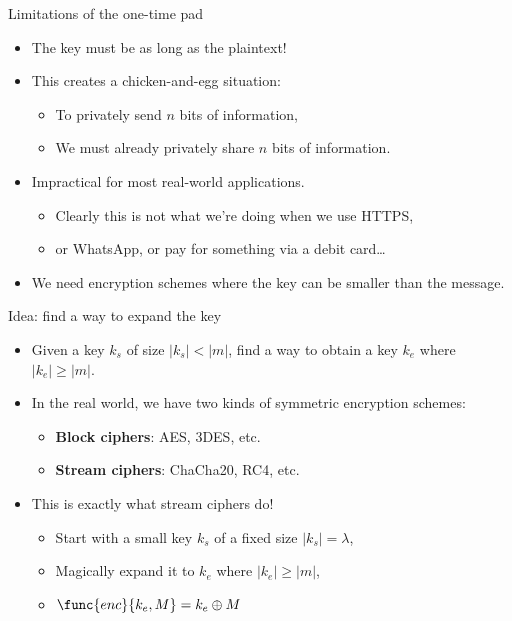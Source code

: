 \ifdefined\PRESENTATION\else\PassOptionsToClass{handout}{beamer}\fi\documentclass[aspectratio=169, lualatex]{beamer}
\begin{document}
\begin{frame}{Limitations of the one-time pad}
	\begin{itemize}
		\item The key must be as long as the plaintext!
		\item This creates a chicken-and-egg situation:
		      \begin{itemize}
			      \item To privately send $n$ bits of information,
			      \item We must already privately share $n$ bits of information.
		      \end{itemize}
		\item Impractical for most real-world applications.
		      \begin{itemize}
			      \item Clearly this is not what we're doing when we use HTTPS,
			      \item or WhatsApp, or pay for something via a debit card\ldots
		      \end{itemize}
		\item We need encryption schemes where the key can be smaller than the message.
	\end{itemize}
\end{frame}

\begin{frame}{Idea: find a way to expand the key}
	\begin{itemize}
		\item Given a key $k_s$ of size $\left|k_s\right| < \left|m\right|$, find a way to obtain a key $k_e$ where $\left|k_e\right| \geq \left|m\right|$.
		\item In the real world, we have two kinds of symmetric encryption schemes:
		      \begin{itemize}
			      \item \textbf{Block ciphers}: AES, 3DES, etc.
			      \item \textbf{Stream ciphers}: ChaCha20, RC4, etc.
		      \end{itemize}
		\item This is exactly what stream ciphers do!
		      \begin{itemize}
			      \item Start with a small key $k_s$ of a fixed size $\left|k_s\right| = \lambda$,
			      \item Magically expand it to $k_e$ where $\left|k_e\right| \geq \left|m\right|$,
			      \item $\func{enc}{k_e, M} = k_e \oplus M$
		      \end{itemize}
	\end{itemize}
\end{frame}
\end{document}
